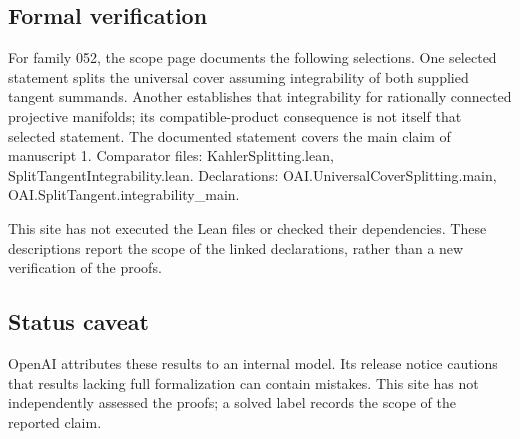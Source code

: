 \documentclass[11pt]{article}
\begin{document}
\subsection{Formal verification}
For family 052, the scope page documents the following selections. One selected statement splits the universal cover assuming integrability of both supplied tangent summands. Another establishes that integrability for rationally connected projective manifolds; its compatible-product consequence is not itself that selected statement. The documented statement covers the main claim of manuscript 1. Comparator files: KahlerSplitting.lean, SplitTangentIntegrability.lean. Declarations: OAI.UniversalCoverSplitting.main, OAI.SplitTangent.integrability\_main.

This site has not executed the Lean files or checked their dependencies. These descriptions report the scope of the linked declarations, rather than a new verification of the proofs.

\subsection{Status caveat}
OpenAI attributes these results to an internal model. Its release notice cautions that results lacking full formalization can contain mistakes. This site has not independently assessed the proofs; a solved label records the scope of the reported claim.
\end{document}

